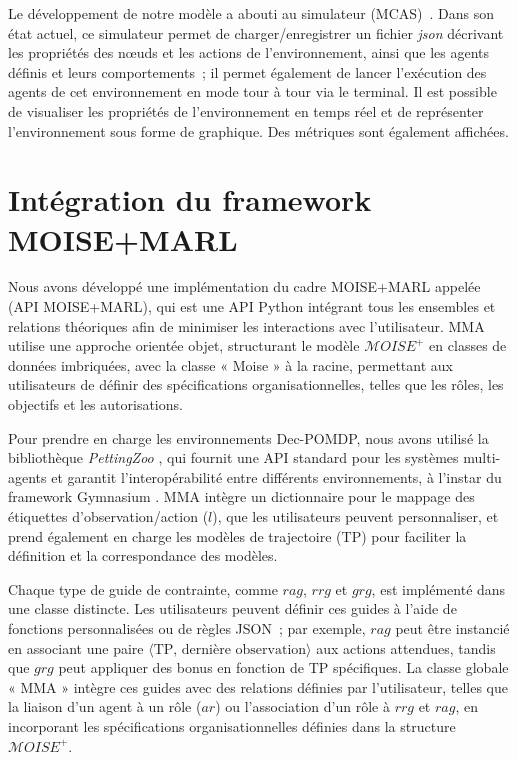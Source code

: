 Le développement de notre modèle a abouti au simulateur  (MCAS)~\cite{MCASWebsite}. Dans son état actuel, ce simulateur permet de charger/enregistrer un fichier \textit{json} décrivant les propriétés des nœuds et les actions de l'environnement, ainsi que les agents définis et leurs comportements~; il permet également de lancer l'exécution des agents de cet environnement en mode tour à tour via le terminal. Il est possible de visualiser les propriétés de l'environnement en temps réel et de représenter l'environnement sous forme de graphique. Des métriques sont également affichées.



\section{Intégration du framework MOISE+MARL}

Nous avons développé une implémentation du cadre MOISE+MARL appelée ~\hyperref[fn:github]{\footnotemark[2]} (API MOISE+MARL), qui est une API Python intégrant tous les ensembles et relations théoriques afin de minimiser les interactions avec l'utilisateur. MMA utilise une approche orientée objet, structurant le modèle $\mathcal{M}OISE^+$ en classes de données imbriquées, avec la classe « Moise » à la racine, permettant aux utilisateurs de définir des spécifications organisationnelles, telles que les rôles, les objectifs et les autorisations.

Pour prendre en charge les environnements Dec-POMDP, nous avons utilisé la bibliothèque \textit{PettingZoo} \cite{terry2020pettingzoo}, qui fournit une API standard pour les systèmes multi-agents et garantit l'interopérabilité entre différents environnements, à l'instar du framework Gymnasium \cite{kwiatkowski2024}. MMA intègre un dictionnaire pour le mappage des étiquettes d'observation/action ($l$), que les utilisateurs peuvent personnaliser, et prend également en charge les modèles de trajectoire (TP) pour faciliter la définition et la correspondance des modèles.

Chaque type de guide de contrainte, comme $rag$, $rrg$ et $grg$, est implémenté dans une classe distincte. Les utilisateurs peuvent définir ces guides à l'aide de fonctions personnalisées ou de règles JSON~; par exemple, $rag$ peut être instancié en associant une paire $\langle \text{TP, dernière observation} \rangle$ aux actions attendues, tandis que $grg$ peut appliquer des bonus en fonction de TP spécifiques. La classe globale « MMA » intègre ces guides avec des relations définies par l'utilisateur, telles que la liaison d'un agent à un rôle ($ar$) ou l'association d'un rôle à $rrg$ et $rag$, en incorporant les spécifications organisationnelles définies dans la structure $\mathcal{M}OISE^+$.

